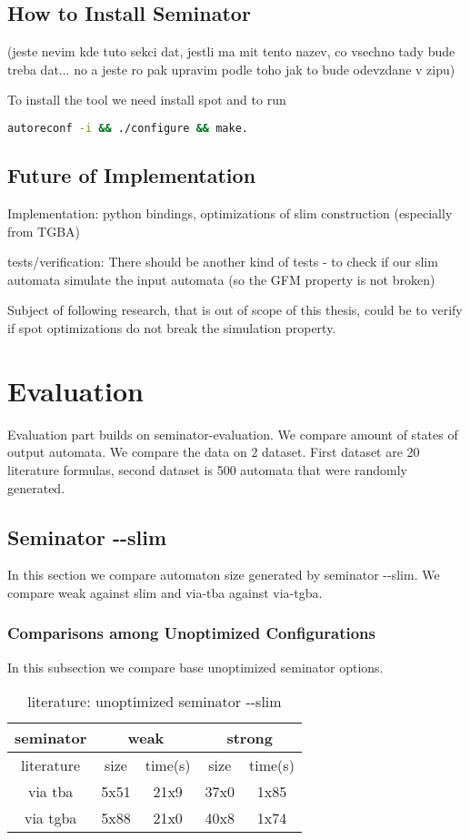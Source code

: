 \documentclass[
	digital
nolof, nolot
]{fithesis3}
\begin{document}
	
	\section{How to Install Seminator}
	(jeste nevim kde tuto sekci dat, jestli ma mit tento nazev, co vsechno tady bude treba dat... no a jeste ro pak upravim podle toho jak to bude odevzdane v zipu)
	
	To install the tool we need install spot and to run 
	
	\begin{lstlisting}[language=bash]
autoreconf -i && ./configure && make.
	\end{lstlisting}
	\section{Future of Implementation}
	Implementation:
	python bindings, optimizations of slim construction (especially from TGBA)
	
	
	
	tests/verification:
	There should be another kind of tests - to check if our slim automata simulate the input automata (so the GFM property is not broken)
	
	Subject of following research, that is out of scope of this thesis, could be to verify if spot optimizations do not break the simulation property. 
	
	\chapter{Evaluation}
	Evaluation part builds on seminator-evaluation. We compare amount of states of output automata. We compare the data on 2 dataset. First dataset are 20 literature formulas, second dataset is 500 automata that were randomly generated.
	
	
	\section{Seminator -\/-slim}
	In this section we compare automaton size generated by seminator -{}-slim.
	We compare weak against slim and via-tba against via-tgba.
	\subsection{Comparisons among Unoptimized Configurations}
	In this subsection we compare base unoptimized seminator options.
\begin{table}[ht]
	\centering
	\caption{literature: unoptimized seminator -\/-slim}
		\begin{tabular}{ |c||c|c|c|c| } 
			\hline
			seminator&\multicolumn{2}{c|}{weak}&\multicolumn{2}{c|}{strong} \\
			\hline
			literature&size&time(s)&size&time(s)\\
			\hhline{|=====|}
			
			via tba&5x51&21x9& 37x0 &1x85\\
			\hline
			via tgba&5x88&21x0& 40x8&1x74\\ 
			\hline
		\end{tabular}
\end{table}
	
\end{document}
